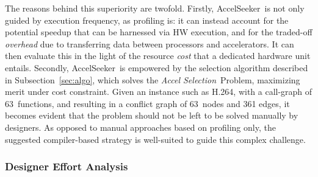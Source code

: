 \documentclass[]{usiinfthesis}
\newcommand{\aseeker}{{AccelSeeker}}
\newcommand{\htsf}{{H.264}}
\newcommand{\asprobname}{\emph{Accel Selection}}
\newcommand{\numberOfcandidates}{{63}}
\begin{document}
The reasons behind this superiority are twofold. Firstly, \aseeker\
is not only guided by execution frequency, as profiling is: it can
instead account for the potential speedup that can be harnessed via
HW execution, and for the traded-off \emph{overhead} due to
transferring data between processors and accelerators. It can then evaluate 
this in the light of the resource \emph{cost} that a dedicated hardware unit 
entails. Secondly, \aseeker\ is empowered by the
selection algorithm described in Subsection~\ref{sec:algo}, which
solves the \asprobname\ Problem, maximizing merit under cost
constraint. Given an instance such as \htsf, with a call-graph of \numberOfcandidates\
functions, and resulting in a conflict graph of \numberOfcandidates\ nodes and 361
edges, it becomes evident that the problem should not be left to be
solved manually by designers. As opposed to manual approaches based on
profiling only, the suggested compiler-based strategy is well-suited to
guide this complex challenge.


%
%
%

\subsubsection{Designer Effort Analysis}
\end{document}

